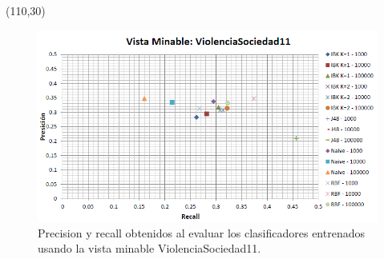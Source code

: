 \documentclass{article}
\begin{document}
\begin{textblock}{80}(110,30)
\begin{figure}[!htb]
\begin{centering}
\includegraphics[scale=0.4]{violenciasociedad11}
\par\end{centering}
\caption{Precision y recall obtenidos al evaluar los clasificadores entrenados usando la vista minable ViolenciaSociedad11.}
\label{fig:figura24}
\end{figure}
\end{textblock}
\end{document}
